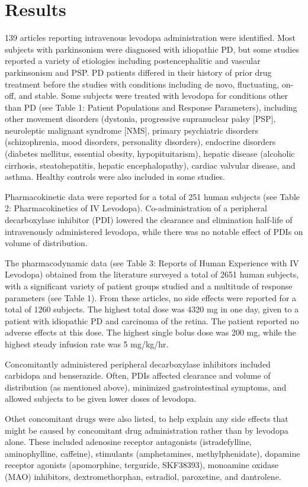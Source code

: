 \section{Results}
139 articles reporting intravenous levodopa administration were identified.  Most subjects with parkinsonism were diagnosed with idiopathic PD, but some studies reported a variety of etiologies including postencephalitic and vascular parkinsonism and PSP.  PD patients differed in their history of prior drug treatment before the studies with conditions including de novo, fluctuating, on-off, and stable.  Some subjects were treated with levodopa for conditions other than PD (see Table 1: Patient Populations and Response Parameters), including other movement disorders (dystonia, progressive supranuclear palsy [PSP], neuroleptic malignant syndrome [NMS], primary psychiatric disorders (schizophrenia, mood disorders, personality disorders),  endocrine disorders (diabetes mellitus, essential obesity, hypopituitarism), hepatic disease (alcoholic cirrhosis, steatohepatitis, hepatic encephalopathy), cardiac valvular disease, and asthma.  Healthy controls were also included in some studies.

Pharmacokinetic data were reported for a total of 251 human subjects (see Table 2: Pharmacokinetics of IV Levodopa).  Co-administration of a peripheral decarboxylase inhibitor (PDI) lowered the clearance and elimination half-life of intravenously administered levodopa, while there was no notable effect of PDIs on volume of distribution.

The pharmacodynamic data (see Table 3: Reports of Human Experience with IV Levodopa) obtained from the literature  surveyed a total of 2651 human subjects, with a significant variety of patient groups studied and a multitude of response parameters (see Table 1).  From these articles, no side effects were reported for a total of 1260 subjects.  The highest total dose was 4320 mg in one day, given to a patient with idiopathic PD and carcinoma of the retina.  The patient reported no adverse effects at this dose.  The highest single bolus dose was 200 mg, while the highest steady infusion rate was 5 mg/kg/hr.

Concomitantly administered peripheral decarboxylase inhibitors included carbidopa and benserazide.  Often, PDIs affected clearance and volume of distribution (as mentioned above), minimized gastrointestinal symptoms, and allowed subjects to be given lower doses of levodopa.    

Othet concomitant drugs were also listed, to help explain any side effects that might be caused by concomitant drug administration rather than by levodopa alone.  These included adenosine receptor antagonists (istradefylline, aminophylline, caffeine), stimulants (amphetamines, methylphenidate), dopamine receptor agonists (apomorphine, terguride, SKF38393), monoamine oxidase (MAO) inhibitors, dextromethorphan, estradiol, paroxetine, and dantrolene.  

